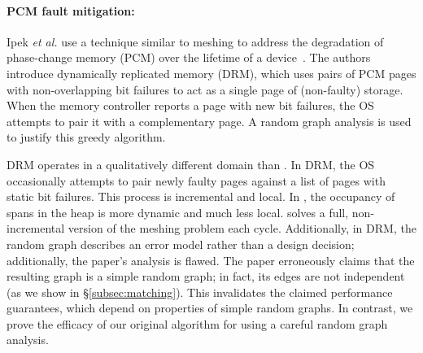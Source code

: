 
\paragraph*{PCM fault mitigation:}
Ipek \emph{et al.} use a technique similar to meshing to address the
degradation of phase-change memory (PCM) over the lifetime of a
device~\cite{ipek:2010:dynamic-replication}.  The authors introduce
dynamically replicated memory (DRM), which uses pairs of PCM pages
with non-overlapping bit failures to act as a single page of
(non-faulty) storage.  When the memory controller reports a page with
new bit failures, the OS attempts to pair it with a complementary
page. A random graph analysis is used to justify this greedy
algorithm.

DRM operates in a qualitatively different domain than \Mesh.  In DRM,
the OS occasionally attempts to pair newly faulty pages
against a list of pages with static bit failures.  This process is
incremental and local.  In \Mesh, the occupancy of spans in the heap
is more dynamic and much less local. \Mesh solves a full,
non-incremental version of the meshing problem each cycle.
Additionally, in DRM, the random graph describes an error model rather
than a design decision; additionally, the paper's analysis is flawed.
The paper erroneously claims that the resulting graph is a simple
random graph; in fact, its edges are not independent (as we show in
\S\ref{subsec:matching}).  This invalidates the claimed performance
guarantees, which depend on properties of simple random graphs. In
contrast, we prove the efficacy of our original \sm algorithm for
\Mesh using a careful random graph analysis.

\begin{comment}
  To avoid catastrophic memory consumption,
Hound employs virtual compaction, a non-randomized, best-effort form
of meshing. Their approach depends on heuristics and does not employ
randomization or come with any guarantees of fragmentation
recovery.
  Hound is not intended to be
space-efficient (and it is not) but rather to find leaks. Hound
identifies leaks by segregating objects by allocation site, protects
``cold'' pages, and delays reuse of pages until every object on that
page has been freed.
\end{comment}

